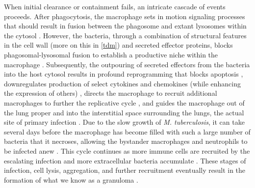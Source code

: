 When initial clearance or containment fails, an intricate cascade of events proceeds. After phagocytosis, the macrophage sets in motion signaling processes that should result in fusion between the phagosome and extant lysosomes within the cytosol \citep{Abramovitch2011}. However, the bacteria, through a combination of structural features in the cell wall (more on this in \autoref{tdm}) and secreted effector proteins, blocks phagosomal\hyp{}lysosomal fusion to establish a productive niche within the macrophage \citep{McDonough1993, Pieters2008, Casonato2014}. Subsequently, the outpouring of secreted effectors from the bacteria into the host cytosol results in profound reprogramming that blocks apoptosis \citep{Ahluwalia2017, Keane1997, Keane2000, Maueroder2016, Yokobori2012, Beckham2017, Wong2017a}, downregulates production of select cytokines and chemokines (while enhancing the expression of others) \citep{Cambier2014a, Fortune2004, MadanLala2011}, directs the macrophage to recruit additional macrophages to further the replicative cycle \citep{Appelberg2015, Pagan2015, Cambier2014b}, and guides the macrophage out of the lung proper and into the interstitial space surrounding the lungs, the actual site of primary infection \citep{Peters2003, Upadhyay2018, Ramakrishnan2012, Cohen2018}. Due to the slow growth of \textit{M. tuberculosis}, it can take several days before the macrophage has become filled with such a large number of bacteria that it necroses, allowing the bystander macrophages and neutrophils to be infected anew \citep{BanosMateos2017}. This cycle continues as more immune cells are recruited by the escalating infection and more extracellular bacteria accumulate \citep{Cadena2016, Lin2006a, Corleis2020, Orme2014a}. These stages of infection, cell lysis, aggregation, and further recruitment eventually result in the formation of what we know as a granuloma \citep{Ramakrishnan2012, Pagan2018}. 

